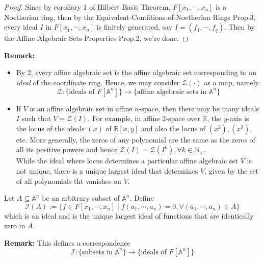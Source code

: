 \begin{proof}
    Since by corollary 1 of Hilbert Basis Theorem, $F[x_1 ,\cdots, x_n]$ is a Noetherian ring, then by the Equivalent-Conditions-of-Noetherian Rings Prop.3, every ideal $I$ in $F[x_1 ,\cdots, x_n]$ is finitely generated, say $I= (f_1 ,\cdots, f_q)$. Then by the Affine Algebraic Sets-Properties Prop.2, we're done.
\end{proof}

\noindent\textbf{Remark:} \begin{itemize}
    \item By 2, every affine algebraic set is the affine algebraic set corresponding to an \textit{ideal} of the coordinate ring. Hence, we may consider $\mathcal{Z}(\cdot)$ as a map, namely
    \[
    \mathcal{Z}: \{\text{ideals of }F [\mathbb{A}^n] \} \to \{\text{affine algebraic sets in } \mathbb{A}^n\}
    \]

    \item If $V$ is an affine algebraic set in affine $n$-space, then there may be many ideals $I$ such that $V= \mathcal{Z}(I)$. For example, in affine $2$-space over $\mathbb{R}$, the $y$-axis is the locus of the ideals $(x)$ of $\mathbb{R}[x,y]$ and also the locus of $(x^2) ,(x^3),$ etc. More generally, the zeros of any polynomial are the same as the zeros of all its positive powers and hence $\mathcal{Z}(I) = \mathcal{Z} (I^k), \forall k\in \mathbb{N}_+$.\\
    While the ideal where locus determines a particular affine algebraic set $V$ is not unique, there is a unique largest ideal that determines $V$, given by the set of all polynomials tht vanishes on $V$.
\end{itemize}

\begin{definition}
    Let $A \subseteq \mathbb{A}^n$ be an arbitrary subset of $\mathbb{A}^n$. Define
    $$\mathcal{I}(A) := \{f\in F[x_1 ,\cdots, x_n] \mid f(a_1 ,\cdots, a_n) =0 ,\forall (a_1 ,\cdots, a_n) \in A\}$$
    which is an ideal and is the unique largest ideal of functions that are identically zero in $A$.
\end{definition}

\noindent\textbf{Remark:} This defines a correspondence
\[
\mathcal{I}: \{ \text{subsets in } \mathbb{A}^n\} \to \{ \text{ideals of }F [\mathbb{A}^n] \}
\]

